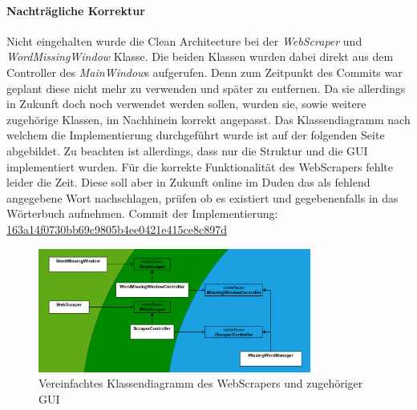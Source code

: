 \paragraph{Nachträgliche Korrektur}
Nicht eingehalten wurde die Clean Architecture bei der \textit{WebScraper} und \textit{WordMissingWindow} Klasse. Die beiden Klassen wurden dabei direkt aus dem Controller des \textit{MainWindow}s aufgerufen. Denn zum Zeitpunkt des Commits war geplant diese nicht mehr zu verwenden und später zu entfernen. Da sie allerdings in Zukunft doch noch verwendet werden sollen, wurden sie, sowie weitere zugehörige Klassen, im Nachhinein korrekt angepasst. Das Klassendiagramm nach welchem die Implementierung durchgeführt wurde ist auf der folgenden Seite abgebildet. Zu beachten ist allerdings, dass nur die Struktur und die GUI implementiert wurden. Für die korrekte Funktionalität des WebScrapers fehlte leider die Zeit. Diese soll aber in Zukunft online im Duden das als fehlend angegebene Wort nachschlagen, prüfen ob es existiert und gegebenenfalls in das Wörterbuch aufnehmen. Commit der Implementierung: \href{https://github.com/EinToni/Wortfinder/commit/163a14f0730bb69c9805b4ee0421e415ce8c897d}{163a14f0730bb69c9805b4ee0421e415ce8c897d}

\begin{figure}[htb]
\centering
\includegraphics[width=0.8\textwidth]{Bilder/CleanArchitectureWebScraper.PNG}
\caption{\label{Abb:CleanArchitectureWebScraper}Vereinfachtes Klassendiagramm des WebScrapers und zugehöriger GUI}
\end{figure}

\endinput